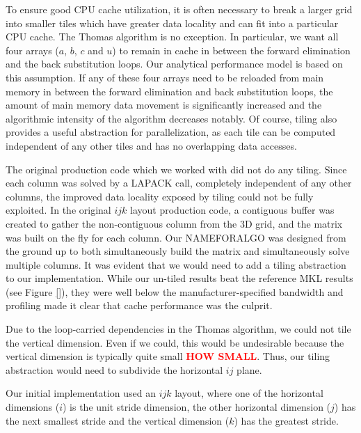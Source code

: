 \documentclass[conference]{IEEEtran}
\newcommand{\fix}[1]{{\bf \textcolor {red}{#1}}}
\begin{document}
To ensure good CPU cache utilization, it is often necessary to break a larger
grid into smaller tiles which have greater data locality and can fit into a
particular CPU cache. The Thomas algorithm is no exception. In particular, we
want all four arrays (\(a\), \(b\), \(c\) and \(u\)) to remain in cache in
between the forward elimination and the back substitution loops. Our analytical
performance model is based on this assumption. If any of these four arrays need
to be reloaded from main memory in between the forward elimination and back
substitution loops, the amount of main memory data movement is significantly
increased and the algorithmic intensity of the algorithm decreases notably. Of
course, tiling also provides a useful abstraction for parallelization, as each
tile can be computed independent of any other tiles and has no overlapping data
accesses.

The original production code which we worked with did not do any tiling. Since
each column was solved by a LAPACK call, completely independent of any other
columns, the improved data locality exposed by tiling could not be fully
exploited. In the original \(ijk\) layout production code, a contiguous buffer
was created to gather the non-contiguous column from the 3D grid, and the
matrix was built on the fly for each column. Our NAMEFORALGO was designed from
the ground up to both simultaneously build the matrix and simultaneously solve
multiple columns. It was evident that we would need to add a tiling abstraction
to our implementation. While our un-tiled results beat the reference MKL
results (see Figure \ref{}), they were well below the manufacturer-specified
bandwidth and profiling made it clear that cache performance was the culprit.

Due to the loop-carried dependencies in the Thomas algorithm, we could not tile
the vertical dimension. Even if we could, this would be undesirable because the
vertical dimension is typically quite small \fix{HOW SMALL}. Thus, our tiling 
abstraction would need to subdivide the horizontal \(ij\) plane.

Our initial implementation used an \(ijk\) layout, where one of the horizontal
dimensions (\(i\)) is the unit stride dimension, the other horizontal dimension
(\(j\)) has the next smallest stride and the vertical dimension (\(k\)) has the
greatest stride.
\end{document}
